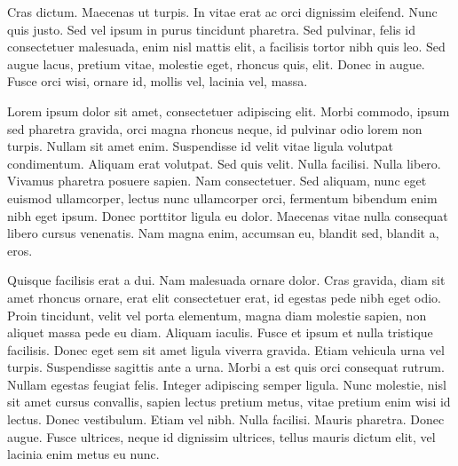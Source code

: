 Cras dictum. Maecenas ut turpis. In vitae erat ac orci dignissim eleifend. Nunc quis justo. Sed vel ipsum in purus tincidunt pharetra. Sed pulvinar, felis id consectetuer malesuada, enim nisl mattis elit, a facilisis tortor nibh quis leo. Sed augue lacus, pretium vitae, molestie eget, rhoncus quis, elit. Donec in augue. Fusce orci wisi, ornare id, mollis vel, lacinia vel, massa.

Lorem ipsum dolor sit amet, consectetuer adipiscing elit. Morbi commodo, ipsum sed pharetra gravida, orci magna rhoncus neque, id pulvinar odio lorem non turpis. Nullam sit amet enim. Suspendisse id velit vitae ligula volutpat condimentum. Aliquam erat volutpat. Sed quis velit. Nulla facilisi. Nulla libero. Vivamus pharetra posuere sapien. Nam consectetuer. Sed aliquam, nunc eget euismod ullamcorper, lectus nunc ullamcorper orci, fermentum bibendum enim nibh eget ipsum. Donec porttitor ligula eu dolor. Maecenas vitae nulla consequat libero cursus venenatis. Nam magna enim, accumsan eu, blandit sed, blandit a, eros.

Quisque facilisis erat a dui. Nam malesuada ornare dolor. Cras gravida, diam sit amet rhoncus ornare, erat elit consectetuer erat, id egestas pede nibh eget odio. Proin tincidunt, velit vel porta elementum, magna diam molestie sapien, non aliquet massa pede eu diam. Aliquam iaculis. Fusce et ipsum et nulla tristique facilisis. Donec eget sem sit amet ligula viverra gravida. Etiam vehicula urna vel turpis. Suspendisse sagittis ante a urna. Morbi a est quis orci consequat rutrum. Nullam egestas feugiat felis. Integer adipiscing semper ligula. Nunc molestie, nisl sit amet cursus convallis, sapien lectus pretium metus, vitae pretium enim wisi id lectus. Donec vestibulum. Etiam vel nibh. Nulla facilisi. Mauris pharetra. Donec augue. Fusce ultrices, neque id dignissim ultrices, tellus mauris dictum elit, vel lacinia enim metus eu nunc.
